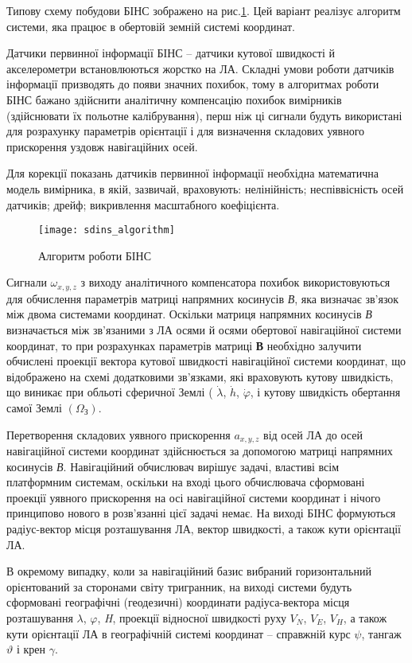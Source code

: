 Типову схему побудови БІНС зображено на рис.\ref{fig:sdins}. Цей варіант реалізує алгоритм системи, 
яка працює в обертовій земній системі координат.

Датчики первинної інформації БІНС -- датчики кутової швидкості й акселерометри встановлюються 
жорстко на ЛА. Складні умови роботи датчиків інформації призводять до появи значних 
похибок, тому в алгоритмах роботи БІНС бажано здійснити аналітичну компенсацію похибок 
вимірників (здійснювати їх польотне калібрування), перш ніж ці сигнали будуть використані 
для розрахунку параметрів орієнтації і для визначення складових уявного прискорення 
уздовж навігаційних осей.

Для корекції показань датчиків первинної інформації необхідна математична модель 
вимірника, в якій, зазвичай, враховують: нелінійність; неспіввісність осей датчиків; 
дрейф; викривлення масштабного коефіцієнта.
\begin{figure}[here]
\centering
\texttt{[image: sdins\_algorithm]}
\caption{Алгоритм роботи БІНС}
\label{fig:sdins}
\end{figure} 
Сигнали $\omega_{x,y,z}$ з виходу аналітичного компенсатора похибок використовуються 
для обчислення параметрів матриці напрямних  косинусів \textit{В}, яка визначає зв'язок 
між двома системами координат. Оскільки матриця напрямних  косинусів \textit{В} визначається 
між зв'язаними з ЛА осями й осями обертової навігаційної системи координат, то при 
розрахунках параметрів матриці \textbf{В }необхідно залучити обчислені проекції вектора 
кутової швидкості навігаційної системи координат, що відображено на схемі додатковими 
зв'язками, які враховують кутову швидкість, що виникає при обльоті сферичної Землі (
$\dot{\lambda }$, $\dot{h}$, $\dot{\varphi }$, і кутову швидкість обертання самої 
Землі $(\Omega_{\text{З}} )$.

Перетворення складових уявного прискорення $a_{x,y,z}$  від осей ЛА до осей навігаційної 
системи координат здійснюється за допомогою матриці напрямних  косинусів \textit{В}. Навігаційний 
обчислювач вирішує задачі, властиві всім платформним системам, оскільки на вході 
цього обчислювача сформовані проекції уявного прискорення на осі навігаційної системи 
координат і нічого принципово нового в розв'язанні цієї задачі немає. На виході БІНС 
формуються радіус-вектор місця розташування ЛА, вектор швидкості, а також кути орієнтації 
ЛА. 

В окремому випадку, коли за навігаційний базис вибраний горизонтальний орієнтований 
за сторонами світу тригранник, на виході системи будуть сформовані географічні (геодезичні) 
координати радіуса-вектора місця розташування $\lambda$, $\varphi$, \textit{H}, проекції 
відносної швидкості руху $V_N$, $V_E$, $V_H$, а також 
кути орієнтації ЛА в географічній системі координат -- справжній курс $\psi$, тангаж $\vartheta$ і 
крен $\gamma$. 

